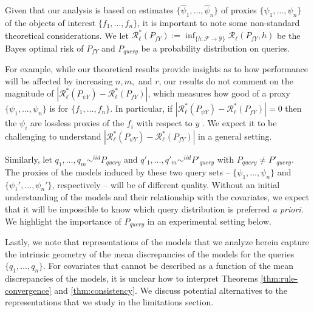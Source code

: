 Given that our analysis is based on estimates $ \{\widehat{\psi}_{1}, \hdots, \widehat{\psi}_{n} \}$ of proxies $ \{\psi_{1}, \hdots, \psi_{n}\} $ of the objects of interest $ \{f_{1}, \hdots, f_{n}\}$, it is important to note some non-standard theoretical considerations.
We let $ \mathcal{R}^{*}_{\ell}(P_{fY}) := \inf_{\{h: \mathcal{F} \to \mathcal{Y}\}}\mathcal{R}_{\ell}(P_{fY}, h) $ be the Bayes optimal risk of $ P_{fY} $ and $ P_{query} $ be a probability distribution on queries. 

For example, while our theoretical results provide insights as to how performance will be affected by increasing $ n, m, $ and $ r $, our results do not comment on the magnitude of $ | \mathcal{R}^{*}_{\ell}(P_{\psi Y}) - \mathcal{R}^{*}_{\ell}(P_{fY}) | $, which measures how good of a proxy $ \{\psi_{1}, \hdots, \psi_{n}\} $ is for $ \{f_{1}, \hdots, f_{n}\} $.
In particular, if $ | \mathcal{R}^{*}_{\ell}(P_{\psi Y}) - \mathcal{R}^{*}_{\ell}(P_{fY}) | = 0 $ then the $ \psi_{i} $ are lossless proxies of the $ f_{i} $ with respect to $ y $ \citep[Chapter~32]{devroye2013probabilistic}.
We expect it to be challenging to understand $ | \mathcal{R}^{*}_{\ell}(P_{\psi Y}) - \mathcal{R}^{*}_{\ell}(P_{fY}) | $ in a general setting.

Similarly, let $ q_{1}, \hdots, q_{m} \sim^{iid} P_{query} $ and $ q'_{1}, \hdots, q'_{m} \sim^{iid} P'_{query} $ with $ P_{query} \neq P'_{query} $.
The proxies of the models induced by these two query sets -- $ \{\psi_{1}, \hdots, \psi_{n}\} $ and $ \{\psi_{1}', \hdots, \psi_{n}'\} $, respectively -- will be of different quality.
Without an initial understanding of the models and their relationship with the covariates, we expect that it will be impossible to know which query distribution is preferred \textit{a priori}. 
We highlight the importance of $ P_{query} $ in an experimental setting below. 

Lastly, we note that representations of the models that we analyze herein capture the intrinsic geometry of the mean discrepancies of the models for the queries $ \{q_{1}, \hdots, q_{n}\} $.
For covariates that cannot be described as a function of the mean discrepancies of the models, it is unclear how to interpret Theorems \ref{thm:rule-convergence} and \ref{thm:consistency}.
We discuss potential alternatives to the representations that we study in the limitations section.

